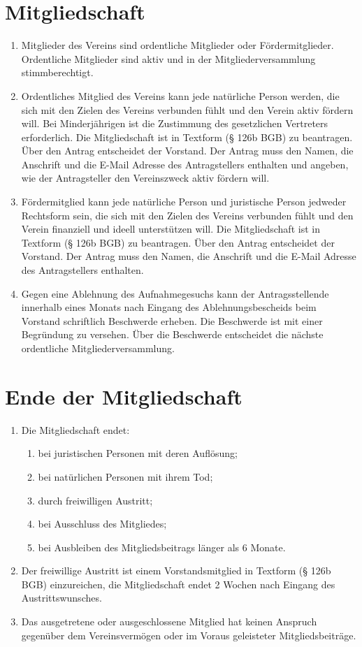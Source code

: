 \documentclass[ngerman]{article}
\begin{document}
\section{Mitgliedschaft}
\begin{enumerate}
  \item Mitglieder des Vereins sind ordentliche Mitglieder oder Fördermitglieder. Ordentliche Mitglieder sind aktiv und in der Mitgliederversammlung stimmberechtigt.
  \item Ordentliches Mitglied des Vereins kann jede natürliche Person werden, die sich mit den Zielen des Vereins verbunden fühlt und den Verein aktiv fördern will. Bei Minderjährigen ist die Zustimmung des gesetzlichen Vertreters erforderlich. Die Mitgliedschaft ist in Textform (§ 126b BGB) zu beantragen. Über den Antrag entscheidet der Vorstand. Der Antrag muss den Namen, die Anschrift und die E-Mail Adresse des Antragstellers enthalten und angeben, wie der Antragsteller den Vereinszweck aktiv fördern will.
  \item Fördermitglied kann jede natürliche Person und juristische Person jedweder Rechtsform sein, die sich mit den Zielen des Vereins verbunden fühlt und den Verein finanziell und ideell unterstützen will. Die Mitgliedschaft ist in Textform (§ 126b BGB) zu beantragen. Über den Antrag entscheidet der Vorstand. Der Antrag muss den Namen, die Anschrift und die E-Mail Adresse des Antragstellers enthalten. 
  \item Gegen eine Ablehnung des Aufnahmegesuchs kann der Antragsstellende innerhalb eines Monats nach Eingang des Ablehnungsbescheids beim Vorstand schriftlich Beschwerde erheben. Die Beschwerde ist mit einer Begründung zu versehen. Über die Beschwerde entscheidet die nächste ordentliche Mitgliederversammlung.
\end{enumerate}


\section{Ende der Mitgliedschaft}
\begin{enumerate}
  \item Die Mitgliedschaft endet:
  \begin{enumerate}
    \item bei juristischen Personen mit deren Auflösung;
    \item bei natürlichen Personen mit ihrem Tod;
    \item durch freiwilligen Austritt;
    \item bei Ausschluss des Mitgliedes;
    \item bei Ausbleiben des Mitgliedsbeitrags länger als 6 Monate.
  \end{enumerate}
  \item Der freiwillige Austritt ist einem Vorstandsmitglied in Textform (§ 126b BGB) einzureichen, die Mitgliedschaft endet 2 Wochen nach Eingang des Austrittswunsches.
  \item Das ausgetretene oder ausgeschlossene Mitglied hat keinen Anspruch gegenüber dem Vereinsvermögen oder im Voraus geleisteter Mitgliedsbeiträge.
\end{enumerate}
\end{document}
